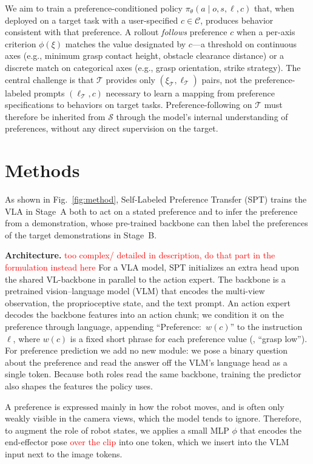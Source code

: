 \documentclass{article}
\begin{document}
We aim to train a preference-conditioned policy $\pi_{\theta}(a\mid o,s,\ell,c)$ that, when deployed on a target task with a user-specified $c\in\mathcal{C}$, produces behavior consistent with that preference.
A rollout \emph{follows} preference $c$ when a per-axis criterion $\phi(\xi)$ matches the value designated by $c$---a threshold on continuous axes (e.g., minimum grasp contact height, obstacle clearance distance) or a discrete match on categorical axes (e.g., grasp orientation, strike strategy).
The central challenge is that $\mathcal{T}$ provides only $(\xi_\mathcal{T},\ell_\mathcal{T})$ pairs, not the preference-labeled prompts $(\ell_\mathcal{T},c)$ necessary to learn a mapping from preference specifications to behaviors on target tasks.
Preference-following on $\mathcal{T}$ must therefore be inherited from $\mathcal{S}$ through the model's internal understanding of preferences, without any direct supervision on the target.

\section{Methods}
\label{sec:methods}



As shown in Fig.~\ref{fig:method}, Self-Labeled Preference Transfer (SPT) trains the VLA in Stage~A both to act on a stated preference and to infer the preference from a demonstration, whose pre-trained backbone can then label the preferences of the target demonstrations in Stage~B.


\textbf{Architecture.}
\textcolor{red}{too complex/ detailed in description, do that part in the formulation instead here}
  For a VLA model, SPT initializes an extra head upon the shared VL-backbone in parallel to the action expert. 
  The backbone is a pretrained vision--language model (VLM) that encodes the multi-view observation, the proprioceptive state, and the text prompt. 
  An action expert decodes the backbone features into an action chunk; 
  we condition it on the preference through language, appending ``Preference:~$w(c)$'' to the instruction~$\ell$, where $w(c)$ is a fixed short
  phrase for each preference value (\eg, ``grasp low''). 
  For preference prediction we add no new module: we pose a binary question about the preference and read the answer off the VLM's language head as a single token. 
  Because both roles read the same backbone, training the predictor also shapes the features the policy uses.

  A preference is expressed mainly in how the robot moves, and is often only weakly visible in the camera views, which the model tends to ignore. Therefore, to augment the role of robot states, we applies a small MLP $\phi$ that encodes the end-effector pose \textcolor{red}{over the clip} into one token, which we insert into the VLM input next to the image tokens. 
\end{document}
